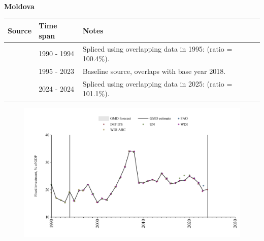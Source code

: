 \documentclass[12pt,a4paper,landscape]{article}
\begin{document}
\begin{adjustbox}{max totalsize={\paperwidth}{\paperheight},center}
\begin{minipage}[t][\textheight][t]{\textwidth}
\vspace*{0.5cm}
{}
\begin{center}
{\Large\bfseries Moldova}
\end{center}
\vspace{0.5cm}
\begin{table}[H]
\centering
\small
\begin{tabular}{|l|l|l|}
\hline
\textbf{Source} & \textbf{Time span} & \textbf{Notes} \\
\hline
\rowcolor{white}\cite{UN}& 1990 - 1994 &Spliced using overlapping data in 1995: (ratio = 100.4\%).\\
\rowcolor{lightgray}\cite{WDI}& 1995 - 2023 &Baseline source, overlaps with base year 2018.\\
\rowcolor{white}\cite{IMF_IFS}& 2024 - 2024 &Spliced using overlapping data in 2025: (ratio = 101.1\%).\\
\hline
\end{tabular}
\end{table}
\begin{figure}[H]
\centering
\includegraphics[width=\textwidth,height=0.6\textheight,keepaspectratio]{graphs/MDA_finv_GDP.pdf}
\end{figure}
\end{minipage}
\end{adjustbox}
\end{document}
